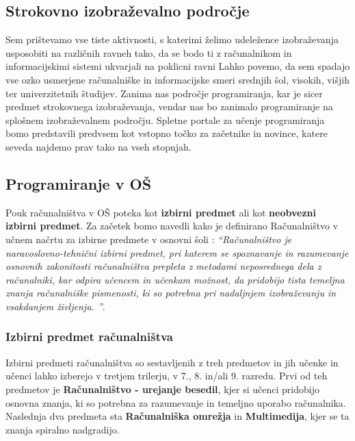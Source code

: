 \subsection{Strokovno izobraževalno področje}
\label{sec:strokovno_izo_podrocje}


Sem prištevamo vse tiste aktivnosti, s katerimi želimo udeležence
izobraževanja usposobiti na različnih ravneh tako, da se bodo ti z
računalnikom in informacijskimi sistemi ukvarjali na poklicni ravni
Lahko povemo, da sem spadajo vse ozko usmerjene računalniške in
informacijske smeri srednjih šol, visokih, višjih ter univerzitetnih
študijev. Zanima nas področje programiranja, kar je sicer predmet
strokovnega izobraževanja, vendar nas bo zanimalo programiranje na
splošnem izobraževalnem področju. Spletne portale za učenje
programiranja bomo predstavili predvsem kot vstopno točko za začetnike
in novince, katere seveda najdemo prav tako na vseh stopnjah. 

\subsection{Programiranje v OŠ}
\label{sec:Programiranje_v_OŠ}

Pouk računalništva v OŠ poteka kot \textbf{izbirni predmet} ali kot
\textbf{neobvezni izbirni predmet}. Za začetek bomo navedli kako je
definirano Računalništvo v učnem načrtu za izbirne predmete v osnovni
šoli \cite{ucni_nacrt-izbirni-os}: \emph{``Računalništvo je
  naravoslovno-tehnični izbirni predmet, pri katerem se spoznavanje in
  razumevanje osnovnih zakonitosti računalništva prepleta z metodami
  neposrednega dela z računalniki, kar odpira učencem in učenkam
  možnost, da pridobijo tista temeljna znanja računalniške pismenosti,
  ki so potrebna pri nadaljnjem izobraževanju in vsakdanjem življenju.
  ''}.

\subsubsection{Izbirni predmet računalništva}
\label{sec:izbirni_predmet_rac}

Izbirni predmeti računalništva so sestavljenih z treh predmetov in jih
učenke in učenci lahko izberejo v tretjem trilerju, v 7., 8. in/ali
9. razredu. Prvi od teh predmetov je \textbf{Računalništvo - urejanje
  besedil}, kjer si učenci pridobijo osnovna znanja, ki so potrebna za
razumevanje in temeljno uporabo računalnika. Naslednja dva predmeta
sta \textbf{Računalniška omrežja} in \textbf{Multimedija}, kjer se ta
znanja spiralno nadgradijo.

